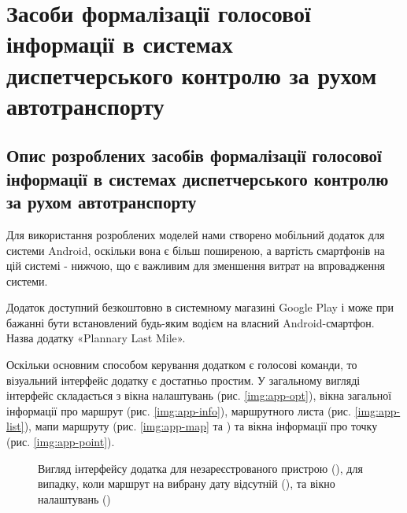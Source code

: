 \chapter{Засоби формалізації голосової інформації в системах диспетчерського контролю за рухом автотранспорту} \label{chapt4}

\section{Опис розроблених засобів формалізації голосової інформації в системах диспетчерського контролю за рухом автотранспорту} \label{sect4_0}

Для використання розроблених моделей нами створено мобільний додаток для системи Android, оскільки вона є більш поширеною, а вартість смартфонів на цій системі - нижчою, що є важливим для зменшення витрат на впровадження системи.

Додаток доступний безкоштовно в системному магазині Google Play і може при бажанні бути встановлений будь-яким водієм на власний Android-смартфон. Назва додатку «Plannary Last Mile».

Оскільки основним способом керування додатком є голосові команди, то візуальний інтерфейс додатку є достатньо простим. У загальному вигляді інтерфейс складається з вікна налаштувань (рис. \ref{img:app-opt}), вікна загальної інформації про маршрут (рис. \ref{img:app-info}), маршрутного листа (рис. \ref{img:app-list}), мапи маршруту (рис. \ref{img:app-map} та ) та вікна інформації про точку (рис. \ref{img:app-point}).

\begin{figure}
	\centering
	\hspace{0pt plus1fill}
	\hspace{0pt plus2fill}
	\hspace{0pt plus2fill}
	\hspace{0pt plus1fill}
	\caption{Вигляд інтерфейсу додатка для незареєстрованого пристрою (), для випадку, коли маршрут на вибрану дату відсутній (), та вікно налаштувань ()}
	\label{img:app-base}
\end{figure}

